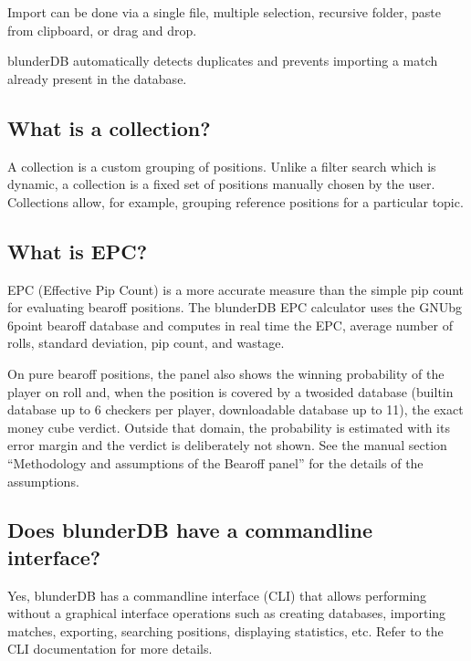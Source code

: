 \documentclass[letterpaper,10pt,english]{sphinxmanual}
\begin{document}
\sphinxAtStartPar
Import can be done via a single file, multiple selection, recursive folder, paste from clipboard, or drag and drop.

\sphinxAtStartPar
blunderDB automatically detects duplicates and prevents importing a match already present in the database.


\subsection{What is a collection?}
\label{\detokenize{faq:qu-est-ce-qu-une-collection}}
\sphinxAtStartPar
A collection is a custom grouping of positions. Unlike a filter search which is dynamic, a collection is a fixed set of positions manually chosen by the user. Collections allow, for example, grouping reference positions for a particular topic.


\subsection{What is EPC?}
\label{\detokenize{faq:qu-est-ce-que-l-epc}}
\sphinxAtStartPar
EPC (Effective Pip Count) is a more accurate measure than the simple pip count for evaluating bearoff positions. The blunderDB EPC calculator uses the GNUbg 6\sphinxhyphen{}point bearoff database and computes in real time the EPC, average number of rolls, standard deviation, pip count, and wastage.

\sphinxAtStartPar
On pure bearoff positions, the panel also shows the winning probability of the player on roll and, when the position is covered by a two\sphinxhyphen{}sided database (built\sphinxhyphen{}in database up to 6 checkers per player, downloadable database up to 11), the exact money cube verdict. Outside that domain, the probability is estimated with its error margin and the verdict is deliberately not shown. See the manual section “Methodology and assumptions of the Bearoff panel” for the details of the assumptions.


\subsection{Does blunderDB have a command\sphinxhyphen{}line interface?}
\label{\detokenize{faq:blunderdb-dispose-t-il-d-une-interface-en-ligne-de-commande}}
\sphinxAtStartPar
Yes, blunderDB has a command\sphinxhyphen{}line interface (CLI) that allows performing without a graphical interface operations such as creating databases, importing matches, exporting, searching positions, displaying statistics, etc. Refer to the CLI documentation for more details.
\end{document}
